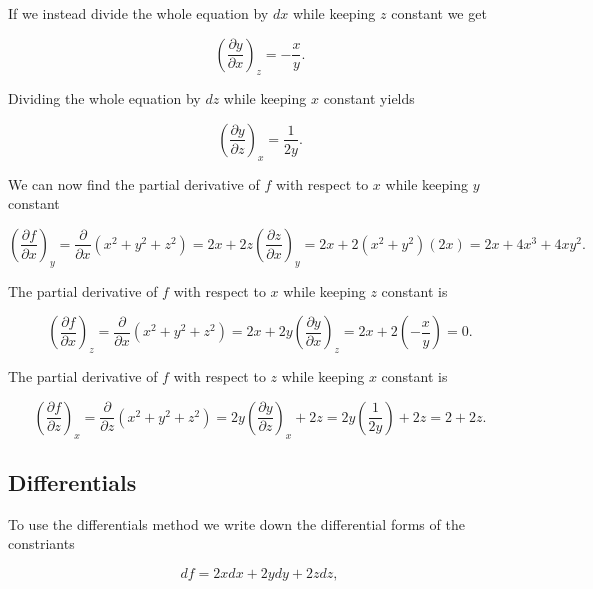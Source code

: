 \documentclass[english,a4paper,12pt]{report}
\begin{document}
If we instead divide the whole equation by \(dx\) while keeping \(z\) constant we get

\begin{equation}
	\left( \frac{\partial y}{\partial x} \right)_{z} = -\frac{x}{y}.  
\end{equation}

Dividing the whole equation by \(dz\) while keeping \(x\) constant yields

\begin{equation}
	\left( \frac{\partial y}{\partial z} \right)_{x} = \frac{1}{2y}.
\end{equation}




We can now find the partial derivative of \(f\) with respect to \(x\) while keeping \(y\) constant

\begin{equation}
	\left( \frac{\partial f}{\partial x} \right)_{y} = \frac{\partial }{\partial x}  (x^2+y^2+z^2) = 2x + 2z \left( \frac{\partial z}{\partial x} \right)_{y} = 2x + 2(x^2+y^2) (2x) = 2x + 4x^3 + 4xy^2.
\end{equation}


The partial derivative of \(f\) with respect to \(x\) while keeping \(z\) constant is

\begin{equation}
	\left( \frac{\partial f}{\partial x} \right)_{z} = \frac{\partial }{\partial x} (x^2+y^2+z^2) = 2x + 2y \left( \frac{\partial y}{\partial x} \right)_{z} = 2x + 2\left( -\frac{x}{y}  \right)  = 0.
\end{equation}

The partial derivative of \(f\) with respect to \(z\) while keeping \(x\) constant is


\begin{equation}
	\left( \frac{\partial f}{\partial z} \right)_{x} = \frac{\partial }{\partial z} (x^2+y^2+z^2) = 2y \left( \frac{\partial y}{\partial z} \right)_{x} + 2z = 2y \left( \frac{1}{2y} \right) + 2z = 2+2z.
\end{equation}

\subsection{Differentials}

To use the differentials method we write down the differential forms of the constriants

\begin{equation}
	df = 2x dx + 2y dy + 2z dz,
\end{equation}
\end{document}
